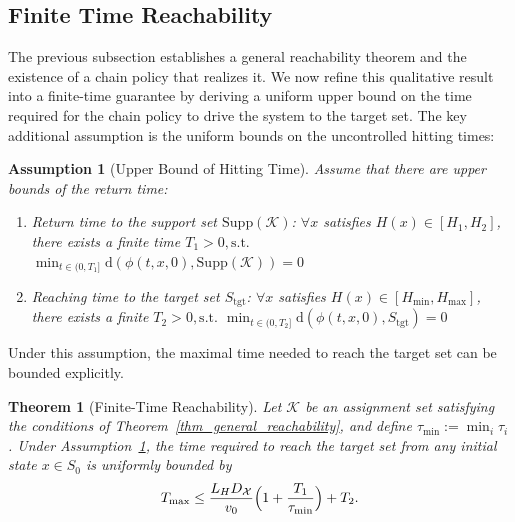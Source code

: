 \documentclass[letterpaper, 10 pt, conference]{ieeeconf}
\newtheorem{assumption}{Assumption}
\newtheorem{theorem}{Theorem}
\newcommand{\K}{\mathcal{K}}
\newcommand{\tgt}{\mathrm{tgt}}
\newcommand{\Supp}{\mathrm{Supp}}
\begin{document}
\subsection{Finite Time Reachability}
\label{sec:finite_time}

The previous subsection establishes a general reachability theorem and the existence of a chain policy that realizes it. We now refine this qualitative result into a finite-time guarantee by deriving a uniform upper bound on the time required for the chain policy to drive the system to the target set. The key additional assumption is the uniform bounds on the uncontrolled hitting times:

\begin{assumption}[Upper Bound of Hitting Time]
\label{ass_upper_bound_return_time}
    Assume that there are upper bounds of the return time:
\begin{enumerate}
    \item Return time to the support set $\Supp(\K)$: $\forall x$ satisfies $H(x)\in [H_{1},H_{2}]$, there exists a finite time $T_1 > 0, 
    \mathrm{s.t.}$ $\min_{t\in(0,T_1]}\mathrm{d}(\phi(t,x,0),\Supp(\K))=0$
    \item Reaching time to the target set $S_{\tgt}$: $\forall x$ satisfies $H(x) \in [H_{\min},H_{\max}]$, there exists a finite $ T_2 > 0, \mathrm{s.t.}$ $\min_{t\in(0,T_2]}\mathrm{d}(\phi(t,x,0),S_{\tgt})=0$
\end{enumerate}
\end{assumption}

Under this assumption, the maximal time needed to reach the target set can be bounded explicitly.

\begin{theorem}[Finite-Time Reachability]
Let $\mathcal{K}$ be an assignment set satisfying the conditions of Theorem~\ref{thm_general_reachability}, and define $\tau_{\min}:=\min_i \tau_i$. Under Assumption~\ref{ass_upper_bound_return_time}, the time required to reach the target set from any initial state $x\in S_0$ is uniformly bounded by
\[
T_{\max} \le \frac{L_H D_{\mathcal X}}{v_0}\Bigl(1+\frac{T_1}{\tau_{\min}}\Bigr) + T_2.
\]
\end{theorem}
\end{document}
